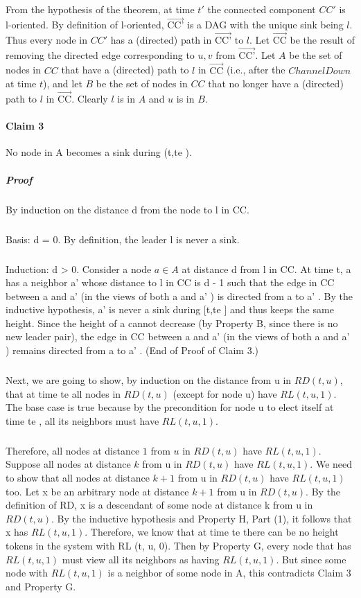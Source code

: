 \subparagraph{}From the hypothesis of the theorem, at time $t'$ the connected component $CC'$ is l-oriented. By definition of l-oriented, $\overrightarrow{\text {CC'}}$ is a DAG with the unique sink being $l$. Thus every node in $CC'$ has a (directed) path in $\overrightarrow{\text {CC'}}$ to $l$. Let $\overrightarrow{\text{CC}}$ be the result of removing the directed edge corresponding to ${u, v}$ from $\overrightarrow{\text {CC'}}$. Let $A$ be the set of nodes in $CC$ that have a (directed) path to $l$ in $\overrightarrow{\text{CC}}$ (i.e., after the $ChannelDown$ at time $t$), and let $B$ be the set of nodes in $CC$ that no longer have a (directed) path to $l$ in $\overrightarrow{\text {CC}}$. Clearly $l$ is in $A$ and $u$ is in $B$.

\paragraph{Claim 3}No node in A becomes a sink during (t,te ).
\subparagraph{Proof}By induction on the distance d from the node to l in CC.
\subparagraph{}Basis: d = 0. By definition, the leader l is never a sink.
\subparagraph{}Induction: d > 0. Consider a node $a \in A$ at distance d from l in CC. At time t, a has a neighbor a' whose distance to l in CC is d - 1 such that the edge in CC between a and a' (in the views of both a and a' ) is directed from a to a' . By the inductive hypothesis, a' is never a sink during [t,te ] and thus keeps the same height. Since the height of a cannot decrease (by Property B, since there is no new leader pair), the edge in CC between a and a' (in the views of both a and a' ) remains directed from a to a' . (End of Proof of Claim 3.)
\subparagraph{}Next, we are going to show, by induction on the distance from u in $RD (t, u)$, that at time te all nodes in $RD (t, u)$ (except for node u) have $RL (t, u, 1)$. The base case is true because by the precondition for node u to elect itself at time te , all its neighbors must have $RL (t, u, 1)$.
\subparagraph{}Therefore, all nodes at distance $1$ from $u$ in $RD (t, u)$ have $RL (t, u, 1)$. Suppose all nodes at distance $k$ from u in $RD (t, u)$ have $RL (t, u, 1)$. We need to show that all nodes at distance $k + 1$ from u in $RD (t, u)$ have $RL (t, u, 1)$ too. Let x be an arbitrary node at distance $k + 1$ from u in $RD (t, u)$. By the definition of RD, x is a descendant of some node at distance k from u in $RD (t, u)$. By the inductive hypothesis and Property H, Part (1), it follows that x has $RL (t, u, 1)$. Therefore, we know that at time te there can be no height tokens in the system with RL (t, u, 0). Then by Property G, every node that has $RL (t, u, 1)$ must view all its neighbors as having $RL (t, u, 1)$. But since some node with $RL (t, u, 1)$ is a neighbor of some node in A, this contradicts Claim 3 and Property G.
